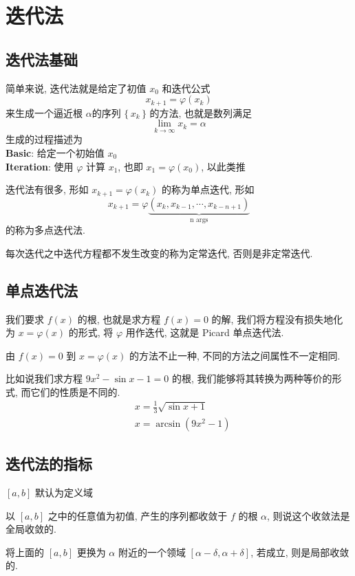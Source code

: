 \section{迭代法}
\subsection{迭代法基础}

\begin{frame}
		简单来说, 迭代法就是给定了初值 \(x_{0}\) 和迭代公式
		\[
				x_{k+1} = \varphi (x _{k})
		\]
		来生成一个逼近根 \(\alpha\)的序列 \(\{ \, x_{k} \, \}\) 的方法, 也就是数列满足
		\[
				\lim _{k \to \infty} x_{k} =\alpha
		\]
		生成的过程描述为\\
		\textbf{Basic}: 给定一个初始值 \(x_{0}\)\\
		\textbf{Iteration}: 使用 \( \varphi\) 计算 \(x_1\), 也即 \(x_1 = \varphi(x_0)\), 以此类推
\end{frame}
\begin{frame}
		迭代法有很多, 形如 \(x_{k+1} = \varphi (x_{k})\) 的称为单点迭代, 形如
		\[
				x_{k+1} = \varphi\underbrace{(x _{k}, x_{k-1}, \cdots , x_{k - n +1})}_{\text{n args}}
		\]
		的称为多点迭代法.

		\smallskip
		每次迭代之中迭代方程都不发生改变的称为定常迭代, 否则是非定常迭代.
\end{frame}

\subsection{单点迭代法}
\begin{frame}
我们要求 \(f (x)\) 的根, 也就是求方程 \(f (x) = 0\) 的解, 我们将方程没有损失地化为 \( x = \varphi (x)\) 的形式, 将 \( \varphi\) 用作迭代, 这就是 Picard 单点迭代法.

\smallskip
		由 \(f (x) = 0\) 到 \(x = \varphi (x)\) 的方法不止一种, 不同的方法之间属性不一定相同.

\smallskip
比如说我们求方程 \( 9 x^{2} - \sin x - 1 = 0\) 的根, 我们能够将其转换为两种等价的形式, 而它们的性质是不同的.
\[
\begin{aligned}
& x = \frac 13 \sqrt{\sin x +1}\\
& x = \arcsin ( 9x^{2} -1)
\end{aligned}
\]
\end{frame}

\subsection{迭代法的指标}
\begin{frame}
		\([a, b]\) 默认为定义域
\begin{defi}[全局收敛]
		以 \([ a, b]\) 之中的任意值为初值, 产生的序列都收敛于 \(f\) 的根 \(\alpha\), 则说这个收敛法是全局收敛的.
\end{defi}
\begin{defi}[局部收敛]
		将上面的 \([a, b]\) 更换为 \(\alpha\) 附近的一个领域 \([\alpha -\delta ,\alpha +\delta]\), 若成立, 则是局部收敛的.
\end{defi}
\end{frame}

